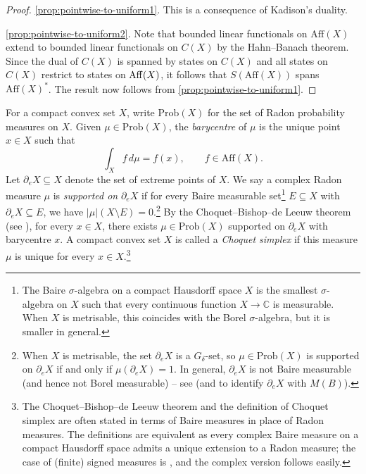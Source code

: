 \documentclass[a4paper,11pt]{amsart}
\theoremstyle{definition}
\numberwithin{equation}{section}
\numberwithin{theorem}{section}
\begin{document}
\begin{proof}
\ref{prop:pointwise-to-uniform1}.  This is a consequence of Kadison's duality.


\ref{prop:pointwise-to-uniform2}.  Note that bounded linear functionals on $\mathrm{Aff}(X)$ extend to bounded linear functionals on $C(X)$ by the Hahn--Banach theorem.  Since the dual of $C(X)$ is spanned by states on $C(X)$ and all states on $C(X)$ restrict to states on ${\rm Aff}(X)$, it follows that $S(\mathrm{Aff}(X))$ spans $\mathrm{Aff}(X)^*$.  The result now follows from \ref{prop:pointwise-to-uniform1}.
\end{proof}
 


For a compact convex set $X$, write $\mathrm{Prob}(X)$ for the set of Radon probability measures on $X$. Given $\mu\in\mathrm{Prob}(X)$, the \emph{barycentre} of $\mu$ is the unique point $x \in X$ such that
\begin{equation}
	\int_X f \, d\mu = f(x), \qquad f \in \mathrm{Aff}(X).
\end{equation}
Let $\partial_e X \subseteq X$ denote the set of extreme points of $X$.  We say a complex Radon measure $\mu$ is \emph{supported on} $\partial_e X$ if for every Baire measurable set\footnote{The Baire $\sigma$-algebra on a compact Hausdorff space $X$ is the smallest $\sigma$-algebra on $X$ such that every continuous function $X \rightarrow \mathbb C$ is measurable.  When $X$ is metrisable, this coincides with the Borel $\sigma$-algebra, but it is smaller in general.} \mbox{$E \subseteq X$} with $\partial_e X \subseteq E$, we have $|\mu|(X\setminus E) = 0$.\footnote{When $X$ is metrisable, the set $\partial_e X$ is a $G_\delta$-set, so $\mu \in \mathrm{Prob}(X)$ is supported on $\partial_e X$ if and only if $\mu(\partial_e X) = 1$.  In general, $\partial_e X$ is not Baire measurable (and hence not Borel measurable) -- see \cite[Section VII]{Bishop-deLeeuw} (and \cite[Lemma 4.1]{Bishop-deLeeuw} to identify $\partial_e X$ with $M(B)$).}  By the Choquet--Bishop--de Leeuw theorem (see \cite[Theorem~I.4.8 and Corollary~1.4.12]{Alf71}), for every $x \in X$, there exists $\mu \in \mathrm{Prob}(X)$ supported on $\partial_e X$ with barycentre $x$.  A compact convex set $X$ is called a \emph{Choquet simplex} if this measure $\mu$ is unique for every $x \in X$.\footnote{The Choquet--Bishop--de Leeuw theorem and the definition of Choquet simplex are often stated in terms of Baire measures in place of Radon measures.  The definitions are equivalent as every complex Baire measure on a compact Hausdorff space admits a unique extension to a Radon measure; the case of (finite) signed measures is \cite[Corollary~7.3.4]{Bogachev07}, and the complex version follows easily.}
\end{document}
